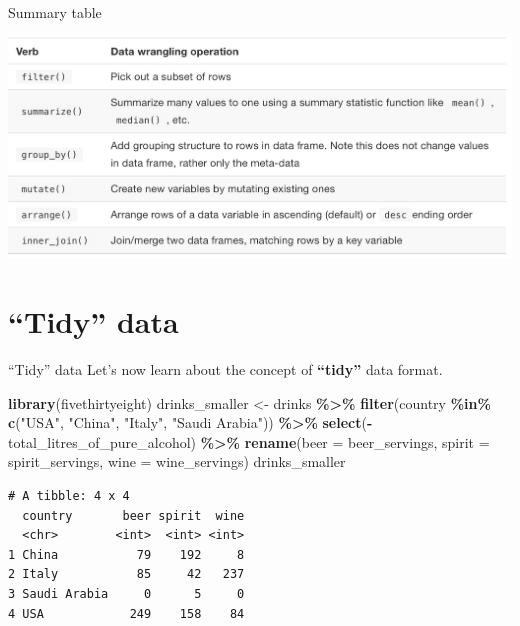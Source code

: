 \documentclass[
  ignorenonframetext,
]{beamer}
\newenvironment{Shaded}{\begin{snugshade}}{\end{snugshade}}
\newcommand{\AttributeTok}[1]{\textcolor[rgb]{0.13,0.29,0.53}{#1}}
\newcommand{\FunctionTok}[1]{\textcolor[rgb]{0.13,0.29,0.53}{\textbf{#1}}}
\newcommand{\NormalTok}[1]{#1}
\newcommand{\OtherTok}[1]{\textcolor[rgb]{0.56,0.35,0.01}{#1}}
\newcommand{\SpecialCharTok}[1]{\textcolor[rgb]{0.81,0.36,0.00}{\textbf{#1}}}
\newcommand{\StringTok}[1]{\textcolor[rgb]{0.31,0.60,0.02}{#1}}
\begin{document}
\begin{frame}{Summary table}
\protect\hypertarget{summary-table}{}
\begin{center}\includegraphics[width=0.8\linewidth,height=0.6\textheight]{week3_7} \end{center}
\end{frame}

\hypertarget{tidy-data}{%
\section{``Tidy'' data}\label{tidy-data}}

\begin{frame}[fragile]{``Tidy'' data}
\protect\hypertarget{tidy-data-1}{}
Let's now learn about the concept of \textbf{``tidy''} data format.

\small

\begin{Shaded}
\begin{Highlighting}[]
\FunctionTok{library}\NormalTok{(fivethirtyeight)}
\NormalTok{drinks\_smaller }\OtherTok{\textless{}{-}}\NormalTok{ drinks }\SpecialCharTok{\%\textgreater{}\%} 
  \FunctionTok{filter}\NormalTok{(country }\SpecialCharTok{\%in\%} \FunctionTok{c}\NormalTok{(}\StringTok{"USA"}\NormalTok{, }\StringTok{"China"}\NormalTok{, }\StringTok{"Italy"}\NormalTok{, }
                        \StringTok{"Saudi Arabia"}\NormalTok{)) }\SpecialCharTok{\%\textgreater{}\%} 
  \FunctionTok{select}\NormalTok{(}\SpecialCharTok{{-}}\NormalTok{total\_litres\_of\_pure\_alcohol) }\SpecialCharTok{\%\textgreater{}\%} 
  \FunctionTok{rename}\NormalTok{(}\AttributeTok{beer =}\NormalTok{ beer\_servings, }\AttributeTok{spirit =}\NormalTok{ spirit\_servings, }
         \AttributeTok{wine =}\NormalTok{ wine\_servings)}
\NormalTok{drinks\_smaller}
\end{Highlighting}
\end{Shaded}

\begin{verbatim}
# A tibble: 4 x 4
  country       beer spirit  wine
  <chr>        <int>  <int> <int>
1 China           79    192     8
2 Italy           85     42   237
3 Saudi Arabia     0      5     0
4 USA            249    158    84
\end{verbatim}

\normalsize
\end{frame}
\end{document}
